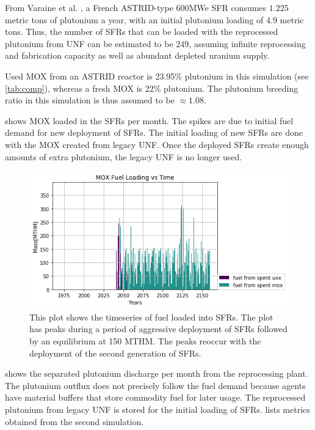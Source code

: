 From Varaine et al. \cite{varaine_pre-conceptual_2012}, a French
ASTRID-type 600\gls{MWe} \gls{SFR} consumes $1.225$ metric tons of
plutonium a year, with an initial plutonium loading of $4.9$ metric tons. 
Thus, the number of \glspl{SFR} that can be loaded with the reprocessed
plutonium from \gls{UNF} can be estimated to be 249, assuming infinite 
reprocessing and fabrication capacity as well as abundant depleted uranium 
supply.
 
Used \gls{MOX} from an ASTRID reactor is 23.95\% plutonium
in this simulation (see \cref{tab:comp}), whereas a fresh \gls{MOX} is 22\% plutonium.
The plutonium breeding ratio in this simulation is thus assumed to be
$\approx 1.08$.

 shows \gls{MOX} loaded in the \glspl{SFR} per month.
The spikes are due to initial fuel demand for new deployment of \glspl{SFR}.
The initial loading of new \glspl{SFR} are done with the \gls{MOX} created
from legacy \gls{UNF}. Once the deployed \glspl{SFR} create enough amounts
 of extra plutonium, the legacy \gls{UNF} is no longer used. 

\begin{figure}[htbp!]
	\begin{center}
		\includegraphics[scale=0.7]{./images/french-transition/where_fuel.png}
	\end{center}
	\caption{This plot shows the timeseries of fuel loaded into \glspl{SFR}.
			 The plot has peaks during a period of aggressive deployment of \glspl{SFR}
			 followed by an equilibrium at 150 \gls{MTHM}. The peaks reoccur with the
			 deployment of the second generation of \glspl{SFR}.}
	\label{fig:fuel}
\end{figure}
  shows the separated plutonium discharge
per month from the reprocessing plant. The plutonium outflux
does not precisely follow the fuel demand because \Cyclus agents have
material buffers that store commodity fuel for later usage. The reprocessed
plutonium from legacy \gls{UNF} is stored for the initial loading of \glspl{SFR}.
 lists metrics obtained from the second simulation.

